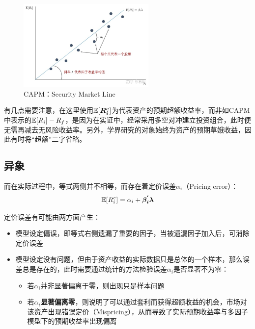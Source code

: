 \documentclass[11pt]{article}
\begin{document}
\begin{figure}[H]
    \centering
    \includegraphics[width=0.6\textwidth]{fig/capm_sml.jpg}
    \caption{CAPM：Security Market Line}
    \label{fig:sml}
\end{figure}

有几点需要注意，在这里使用$\mathbb{E}[\bm{R_i^e}]$为代表资产的预期超额收益率，而非如CAPM中表示的$\mathbb{E}[R_i] - R_f$，是因为在实证中，经常采用多空对冲建立投资组合，此时便无需再减去无风险收益率。另外，学界研究的对象始终为资产的预期草娥收益，因此有时将“超额”二字省略。

\subsection{异象}

而在实际过程中，等式两侧并不相等，而存在着定价误差$\alpha_i$（Pricing error）：
\begin{equation*}
    \mathbb{E}[R_i^e] = \alpha_i + \bm{\beta_{i}^{'} \lambda}
\end{equation*}

定价误差有可能由两方面产生：
\begin{itemize}
    \item 模型设定偏误，即等式右侧遗漏了重要的因子，当被遗漏因子加入后，可消除定价误差
    \item 模型设定没有问题，但由于资产收益的实际数据只是总体的一个样本，那么误差总是存在的，此时需要通过统计的方法检验误差$\alpha_i$是否显著不为零：
    \begin{itemize}
        \item 若$\alpha_i$并非显著偏离于零，则出现只是样本问题
        \item 若$\alpha_i$\textbf{显著偏离零}，则说明了可以通过套利而获得超额收益的机会，市场对该资产出现错误定价（Mispricing），从而导致了实际预期收益率与多因子模型下的预期收益率出现偏离
    \end{itemize}
\end{itemize}
\end{document}
